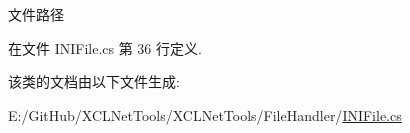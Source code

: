 文件路径 



在文件 I\+N\+I\+File.\+cs 第 36 行定义.



该类的文档由以下文件生成\+:\begin{DoxyCompactItemize}
\item 
E\+:/\+Git\+Hub/\+X\+C\+L\+Net\+Tools/\+X\+C\+L\+Net\+Tools/\+File\+Handler/\hyperlink{_i_n_i_file_8cs}{I\+N\+I\+File.\+cs}\end{DoxyCompactItemize}
